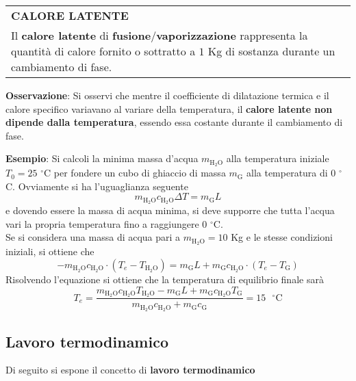 \documentclass[a4paper]{extarticle}
\renewcommand\arraystretch{}
\begin{document}
\vspace{1em}
\setlength{\tabcolsep}{14pt}
\renewcommand{\arraystretch}{2}
\noindent
\begin{tabularx}{\textwidth}{@{}|P|@{}}
    \hline
    {\textbf{CALORE LATENTE}}\\
    \parbox{\linewidth}{Il \textbf{calore latente} di \textbf{fusione}/\textbf{vaporizzazione} rappresenta la quantità di calore fornito o sottratto a $1$ Kg di sostanza durante un cambiamento di fase.\vspace{3mm}}\\
    \hline
\end{tabularx}

\vspace{1em}
\noindent
\textbf{Osservazione}: Si osservi che mentre il coefficiente di dilatazione termica e il calore specifico variavano al variare della temperatura, il \textbf{calore latente non dipende dalla temperatura}, essendo essa costante durante il cambiamento di fase.

\vspace{1em}
\noindent
\textbf{Esempio}: Si calcoli la minima massa d'acqua $m_{\text{H}_2\text{O}}$ alla temperatura iniziale $T_0=25$ $^\circ$C per fondere un cubo di ghiaccio di massa $m_\text{G}$ alla temperatura di $0$ $^\circ$C. Ovviamente si ha l'uguaglianza seguente
\[m_{\text{H}_2\text{O}} c_{\text{H}_2\text{O}} \Delta T = m_\text{G} L\]
e dovendo essere la massa di acqua minima, si deve supporre che tutta l'acqua vari la propria temperatura fino a raggiungere $0$ $^\circ$C.\\
Se si considera una massa di acqua pari a $m_{\text{H}_2\text{O}} = 10$ Kg e le stesse condizioni iniziali, si ottiene che
\[-m_{\text{H}_2\text{O}} c_{\text{H}_2\text{O}} \cdot (T_e - T_{\text{H}_2\text{O}}) = m_\text{G} L + m_\text{G} c_{\text{H}_2\text{O}} \cdot (T_e - T_\text{G})\]
Risolvendo l'equazione si ottiene che la temperatura di equilibrio finale sarà
\[T_e=\frac{m_{\text{H}_2\text{O}} c_{\text{H}_2\text{O}} T_{\text{H}_2\text{O}} - m_\text{G} L + m_\text{G} c_{\text{H}_2\text{O}} T_\text{G}}{m_{\text{H}_2\text{O}} c_{\text{H}_2\text{O}} + m_\text{G} c_\text{G}} = 15 \text{ } ^\circ \text{C}\]

\vspace{1em}
\subsection{Lavoro termodinamico}
Di seguito si espone il concetto di \textbf{lavoro termodinamico}
\end{document}
